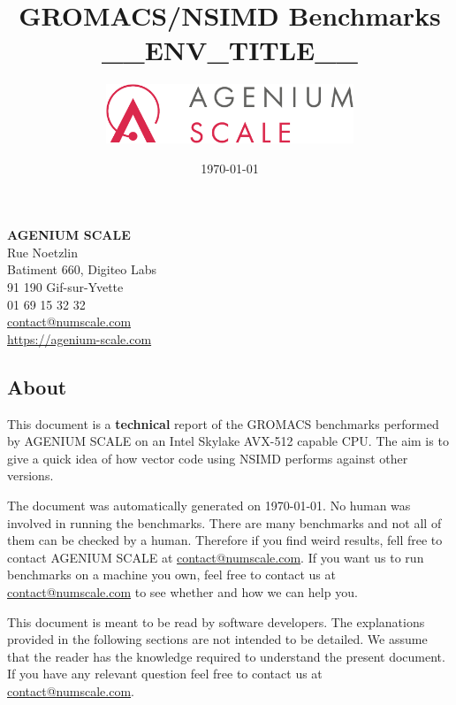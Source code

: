 \documentclass[a4paper,11pt]{article}
\date{\today}
\author{\includegraphics[width=20em]{logo_agenium_scale}}
\title{GROMACS/NSIMD Benchmarks __ENV_TITLE__}
\newcommand{\gromacs}{GROMACS}
\newcommand{\nsimd}{NSIMD}
\newcommand{\cpu}{CPU}
\newcommand{\ageniumscale}{AGENIUM SCALE}
\begin{document}
\maketitle%
\vspace*{\fill}%
\noindent%
\textbf{\ageniumscale{}}\\
Rue Noetzlin\\
Batiment 660, Digiteo Labs\\
91 190 Gif-sur-Yvette\\
01 69 15 32 32\\
\href{mailto://contact@numscale.com}{contact@numscale.com}\\
\href{https://agenium-scale.com}{https://agenium-scale.com}\\
\thispagestyle{empty}
\clearpage
%
\thispagestyle{empty}
\tableofcontents
\newpage

\subsection*{About}%
\label{sec:about}

This document is a \textbf{technical} report of the \gromacs{} benchmarks
performed by \ageniumscale{} on an Intel Skylake AVX-512 capable \cpu. The aim
is to give a quick idea of how vector code using \nsimd{} performs against
other versions.

The document was automatically generated on \today. No human was involved in
running the benchmarks. There are many benchmarks and not all of them can be
checked by a human. Therefore if you find weird results, fell free to contact
\ageniumscale{} at \href{mailto://contact@numscale.com}{contact@numscale.com}.
If you want us to run benchmarks on a machine you own, feel free to contact us
at \href{mailto://contact@numscale.com}{contact@numscale.com} to see whether
and how we can help you.

This document is meant to be read by software developers. The explanations
provided in the following sections are not intended to be detailed. We assume
that the reader has the knowledge required to understand the present document.
If you have any relevant question feel free to contact us at
\href{mailto://contact@numscale.com}{contact@numscale.com}.
\end{document}
